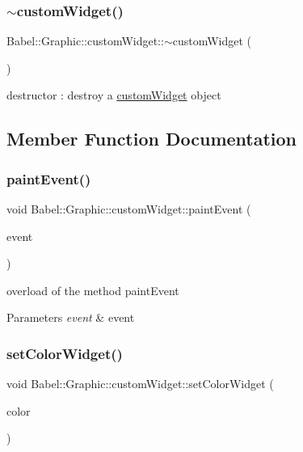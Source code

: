 \subsubsection{\texorpdfstring{$\sim$custom\+Widget()}{~customWidget()}}
{\footnotesize\ttfamily Babel\+::\+Graphic\+::custom\+Widget\+::$\sim$custom\+Widget (\begin{DoxyParamCaption}{ }\end{DoxyParamCaption})\hspace{0.3cm}{\ttfamily [default]}}

destructor \+: destroy a \hyperlink{classBabel_1_1Graphic_1_1customWidget}{custom\+Widget} object 

\subsection{Member Function Documentation}
\mbox{\label{classBabel_1_1Graphic_1_1customWidget_aa50ce04827e61129f279cf3e6073ad0c}} 
\subsubsection{\texorpdfstring{paint\+Event()}{paintEvent()}}
{\footnotesize\ttfamily void Babel\+::\+Graphic\+::custom\+Widget\+::paint\+Event (\begin{DoxyParamCaption}\item[{Q\+Paint\+Event $\ast$}]{event }\end{DoxyParamCaption})\hspace{0.3cm}{\ttfamily [protected]}}

overload of the method paint\+Event 
\begin{DoxyParams}{Parameters}
{\em event} & event \\
\hline
\end{DoxyParams}
\mbox{\label{classBabel_1_1Graphic_1_1customWidget_aeea58299a81ac46d8b5a25220789e533}} 
\subsubsection{\texorpdfstring{set\+Color\+Widget()}{setColorWidget()}}
{\footnotesize\ttfamily void Babel\+::\+Graphic\+::custom\+Widget\+::set\+Color\+Widget (\begin{DoxyParamCaption}\item[{Q\+List$<$ qint32 $>$}]{color }\end{DoxyParamCaption})}


